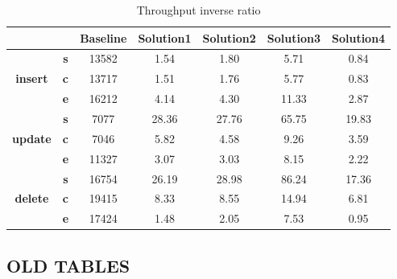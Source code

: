 \begin{table}[h]
\centering
\caption{Throughput inverse ratio}\label{t:}
\begin{tabular}{ccccccc}
\toprule
&&\textbf{Baseline} & \textbf{Solution1} & \textbf{Solution2} & \textbf{Solution3} & \textbf{Solution4}\\
\midrule
\multirow{3}{*}{\textbf{insert}} & \textbf{s} & 13582 & 1.54 & 1.80 & 5.71 & 0.84\\
 & \textbf{c} & 13717 & 1.51 & 1.76 & 5.77 & 0.83\\
 & \textbf{e} & 16212 & 4.14 & 4.30 & 11.33 & 2.87\\
\midrule
\multirow{3}{*}{\textbf{update}} & \textbf{s} & 7077 & 28.36 & 27.76 & 65.75 & 19.83\\
 & \textbf{c} & 7046 & 5.82 & 4.58 & 9.26 & 3.59\\
 & \textbf{e} & 11327 & 3.07 & 3.03 & 8.15 & 2.22\\
\midrule
\multirow{3}{*}{\textbf{delete}} & \textbf{s} & 16754 & 26.19 & 28.98 & 86.24 & 17.36\\
 & \textbf{c} & 19415 & 8.33 & 8.55 & 14.94 & 6.81\\
 & \textbf{e} & 17424 & 1.48 & 2.05 & 7.53 & 0.95\\
\bottomrule
\end{tabular}
\end{table}

 
\clearpage
\subsection{OLD TABLES}

